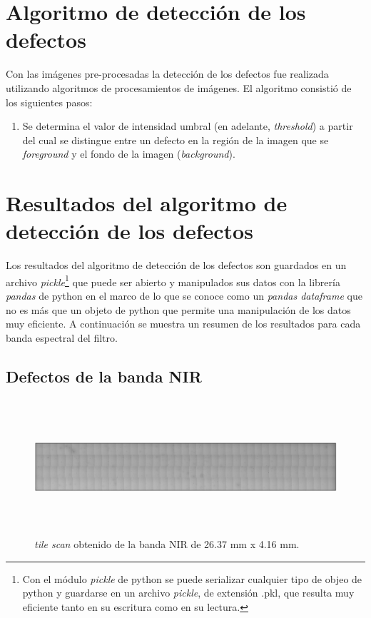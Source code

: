 \documentclass{ctuthesis}
\begin{document}
\singlespacing
\section*{Algoritmo de detección de los defectos}

\hspace{0.5cm}Con las imágenes pre-procesadas la detección de los defectos fue realizada utilizando algoritmos de procesamientos de imágenes. El algoritmo consistió de los siguientes pasos:
\begin{enumerate}
	\item Se determina el valor de intensidad umbral (en adelante, \textit{threshold}) a partir del cual se distingue entre un defecto en la región de la imagen que se \textit{foreground} y el fondo de la imagen (\textit{background}). %
\end{enumerate}





\singlespacing
\section*{Resultados del algoritmo de detección de los defectos}


\hspace{0.5cm}Los resultados del algoritmo de detección de los defectos son guardados en un archivo \textit{pickle}\footnote{Con el módulo \textit{pickle} de python se puede serializar cualquier tipo de objeo de python y guardarse en un archivo \textit{pickle}, de extensión .pkl, que resulta muy eficiente tanto en su escritura como en su lectura.} que puede ser abierto y manipulados sus datos con la librería \textit{pandas} de python en el marco de lo que se conoce como un \textit{pandas dataframe} que no es más que un objeto de python que permite una manipulación de los datos muy eficiente. A continuación se muestra un resumen de los resultados para cada banda espectral del filtro.

\singlespacing
\subsection*{Defectos de la banda NIR}


\begin{figure}[H]
	\centering
	\includegraphics[width=1.0\textwidth,height= 5.0cm]{Figs/resultados_defectos/banda_nir.png}
	\caption{\textit{tile scan} obtenido de la banda NIR de 26.37 mm x 4.16 mm.}
	\label{fig:bgcel}
\end{figure}
\end{document}
